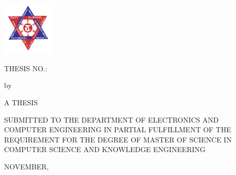 \begin{titlepage}

\begin{center}
\includegraphics[height = 2.6cm]{frontmatter/images/tu.jpg} 

\linespread{1.5}

\bf{
    \vspace{0.5cm}

\MakeUppercase{\myuniversity}

\MakeUppercase{\myinstitute}

\MakeUppercase{\mycampus }

\vspace{1cm}

\begin{flushleft}
   \MakeUppercase{thesis no.: \roll } 

   
\end{flushleft}

{\thetitle}





\vspace{1cm}
{by}
 
\theauthor

\vspace{1cm}


\vspace{1cm}

{A THESIS  

SUBMITTED TO THE DEPARTMENT OF ELECTRONICS AND
COMPUTER ENGINEERING IN PARTIAL FULFILLMENT OF THE REQUIREMENT FOR THE DEGREE OF MASTER OF SCIENCE IN COMPUTER SCIENCE AND KNOWLEDGE ENGINEERING
}
\vspace{1cm}

\MakeUppercase{\mydepartment}

\MakeUppercase{\campusaddress}

\vspace{1cm}

NOVEMBER,
\thedate
}
\end{center}
\end{titlepage}
